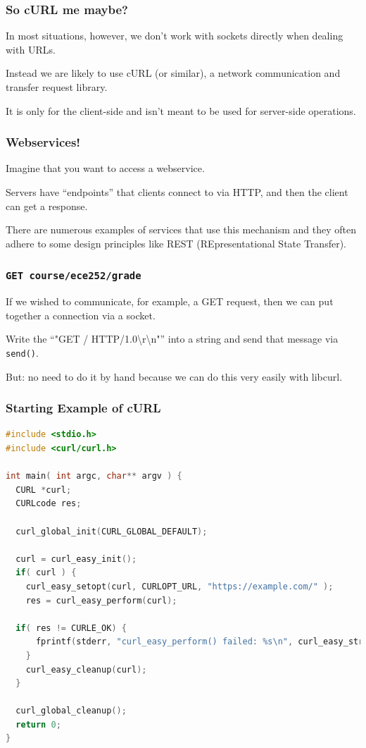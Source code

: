\begin{frame}
\frametitle{So cURL me maybe?}

In most situations, however, we don't work with sockets directly when dealing with URLs. 

Instead we are likely to use cURL (or similar), a network communication and transfer request library. 

It is only for the client-side and isn't meant to be used for server-side operations.

\end{frame}



\begin{frame}
\frametitle{Webservices!}

Imagine that you want to access a webservice.

Servers have ``endpoints'' that clients connect to via HTTP, and then the client can get a response. 

There are numerous examples of services that use this mechanism and they often adhere to some design principles like REST (REpresentational State Transfer).

\end{frame}



\begin{frame}
\frametitle{\texttt{GET course/ece252/grade}}

If we wished to communicate, for example, a GET request, then we can put together a connection via a socket.

Write the ``"GET / HTTP/1.0\textbackslash r\textbackslash n"'' into a string and send that message via \texttt{send()}. 

But: no need to do it by hand because we can do this very easily with libcurl.

\end{frame}



\begin{frame}[fragile]
\frametitle{Starting Example of cURL}

\begin{lstlisting}[language=C]
#include <stdio.h>
#include <curl/curl.h>
 
int main( int argc, char** argv ) {
  CURL *curl;
  CURLcode res;
 
  curl_global_init(CURL_GLOBAL_DEFAULT);
 
  curl = curl_easy_init();
  if( curl ) {
    curl_easy_setopt(curl, CURLOPT_URL, "https://example.com/" );
    res = curl_easy_perform(curl);
    
  if( res != CURLE_OK) {
      fprintf(stderr, "curl_easy_perform() failed: %s\n", curl_easy_strerror(res));
    }
    curl_easy_cleanup(curl);
  }
 
  curl_global_cleanup();
  return 0;
}
\end{lstlisting}

\end{frame}



